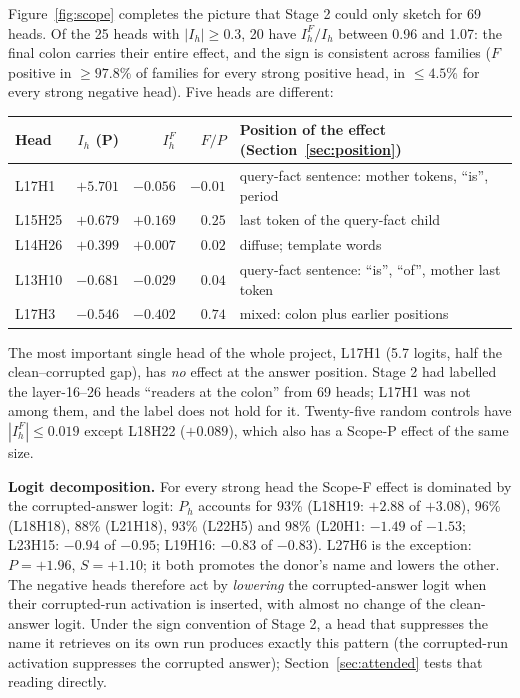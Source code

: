 \documentclass[11pt,a4paper]{article}
\begin{document}
Figure~\ref{fig:scope} completes the picture that Stage 2 could only sketch for 69
heads. Of the 25 heads with $|I_h|\ge 0.3$, 20 have $I^F_h/I_h$ between 0.96 and 1.07:
the final colon carries their entire effect, and the sign is consistent across
families ($F$ positive in $\ge 97.8\%$ of families for every strong positive head,
in $\le 4.5\%$ for every strong negative head). Five heads are different:

\begin{center}
\small
\begin{tabular}{lrrrl}
\toprule
Head & $I_h$ (P) & $I^F_h$ & $F/P$ & Position of the effect (Section~\ref{sec:position}) \\
\midrule
L17H1  & $+5.701$ & $-0.056$ & $-0.01$ & query-fact sentence: mother tokens, ``is'', period \\
L15H25 & $+0.679$ & $+0.169$ & $0.25$ & last token of the query-fact child \\
L14H26 & $+0.399$ & $+0.007$ & $0.02$ & diffuse; template words \\
L13H10 & $-0.681$ & $-0.029$ & $0.04$ & query-fact sentence: ``is'', ``of'', mother last token \\
L17H3  & $-0.546$ & $-0.402$ & $0.74$ & mixed: colon plus earlier positions \\
\bottomrule
\end{tabular}
\end{center}

The most important single head of the whole project, L17H1 (5.7 logits, half the
clean--corrupted gap), has \emph{no} effect at the answer position. Stage 2 had labelled
the layer-16--26 heads ``readers at the colon'' from 69 heads; L17H1 was not among
them, and the label does not hold for it. Twenty-five random controls have
$|I^F_h|\le 0.019$ except L18H22 ($+0.089$), which also has a Scope-P effect of the
same size.

\textbf{Logit decomposition.} For every strong head the Scope-F effect is dominated by
the corrupted-answer logit: $P_h$ accounts for 93\% (L18H19: $+2.88$ of $+3.08$),
96\% (L18H18), 88\% (L21H18), 93\% (L22H5) and 98\% (L20H1: $-1.49$ of $-1.53$;
L23H15: $-0.94$ of $-0.95$; L19H16: $-0.83$ of $-0.83$). L27H6 is the exception:
$P=+1.96$, $S=+1.10$; it both promotes the donor's name and lowers the other. The
negative heads therefore act by \emph{lowering} the corrupted-answer logit when their
corrupted-run activation is inserted, with almost no change of the clean-answer logit.
Under the sign convention of Stage 2, a head that suppresses the name it retrieves on
its own run produces exactly this pattern (the corrupted-run activation suppresses
the corrupted answer); Section~\ref{sec:attended} tests that reading directly.
\end{document}
